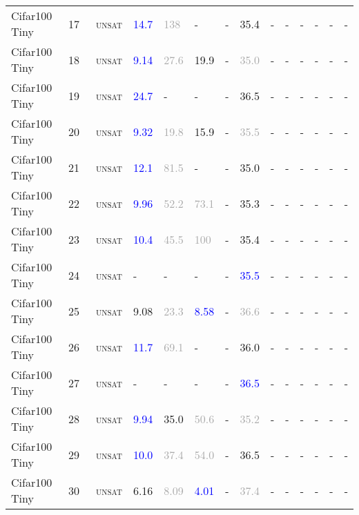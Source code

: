 \begin{center}
{\begin{longtable}{@{}llllllllllllll@{}}
Cifar100 Tiny & 17 & ~\textsc{unsat} & \textcolor{blue}{14.7} & \textcolor{darkgray}{138} & - & - & \textcolor{second}{35.4} & - & - & - & - & - & - \\
Cifar100 Tiny & 18 & ~\textsc{unsat} & \textcolor{blue}{9.14} & \textcolor{darkgray}{27.6} & \textcolor{second}{19.9} & - & \textcolor{darkgray}{35.0} & - & - & - & - & - & - \\
Cifar100 Tiny & 19 & ~\textsc{unsat} & \textcolor{blue}{24.7} & - & - & - & \textcolor{second}{36.5} & - & - & - & - & - & - \\
Cifar100 Tiny & 20 & ~\textsc{unsat} & \textcolor{blue}{9.32} & \textcolor{darkgray}{19.8} & \textcolor{second}{15.9} & - & \textcolor{darkgray}{35.5} & - & - & - & - & - & - \\
Cifar100 Tiny & 21 & ~\textsc{unsat} & \textcolor{blue}{12.1} & \textcolor{darkgray}{81.5} & - & - & \textcolor{second}{35.0} & - & - & - & - & - & - \\
Cifar100 Tiny & 22 & ~\textsc{unsat} & \textcolor{blue}{9.96} & \textcolor{darkgray}{52.2} & \textcolor{darkgray}{73.1} & - & \textcolor{second}{35.3} & - & - & - & - & - & - \\
Cifar100 Tiny & 23 & ~\textsc{unsat} & \textcolor{blue}{10.4} & \textcolor{darkgray}{45.5} & \textcolor{darkgray}{100} & - & \textcolor{second}{35.4} & - & - & - & - & - & - \\
Cifar100 Tiny & 24 & ~\textsc{unsat} & - & - & - & - & \textcolor{blue}{35.5} & - & - & - & - & - & - \\
Cifar100 Tiny & 25 & ~\textsc{unsat} & \textcolor{second}{9.08} & \textcolor{darkgray}{23.3} & \textcolor{blue}{8.58} & - & \textcolor{darkgray}{36.6} & - & - & - & - & - & - \\
Cifar100 Tiny & 26 & ~\textsc{unsat} & \textcolor{blue}{11.7} & \textcolor{darkgray}{69.1} & - & - & \textcolor{second}{36.0} & - & - & - & - & - & - \\
Cifar100 Tiny & 27 & ~\textsc{unsat} & - & - & - & - & \textcolor{blue}{36.5} & - & - & - & - & - & - \\
Cifar100 Tiny & 28 & ~\textsc{unsat} & \textcolor{blue}{9.94} & \textcolor{second}{35.0} & \textcolor{darkgray}{50.6} & - & \textcolor{darkgray}{35.2} & - & - & - & - & - & - \\
Cifar100 Tiny & 29 & ~\textsc{unsat} & \textcolor{blue}{10.0} & \textcolor{darkgray}{37.4} & \textcolor{darkgray}{54.0} & - & \textcolor{second}{36.5} & - & - & - & - & - & - \\
Cifar100 Tiny & 30 & ~\textsc{unsat} & \textcolor{second}{6.16} & \textcolor{darkgray}{8.09} & \textcolor{blue}{4.01} & - & \textcolor{darkgray}{37.4} & - & - & - & - & - & - \\

\end{longtable}}
\end{center}
